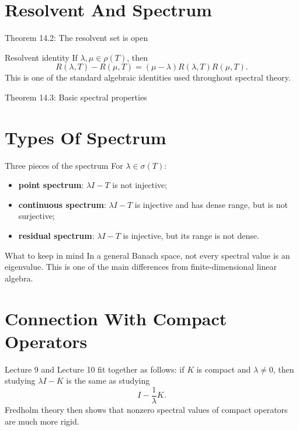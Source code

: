 \documentclass[11pt]{article}
\begin{document}
\section{Resolvent And Spectrum}

\begin{thmbox}{Theorem 14.2: The resolvent set is open}
\thmResolventAnalytic
\end{thmbox}

\begin{thmbox}{Resolvent identity}
If $\lambda,\mu\in\rho(T)$, then
\[
R(\lambda,T)-R(\mu,T)=(\mu-\lambda)R(\lambda,T)R(\mu,T).
\]
This is one of the standard algebraic identities used throughout spectral theory.
\end{thmbox}

\begin{thmbox}{Theorem 14.3: Basic spectral properties}
\thmSpectralRadius
\end{thmbox}

\section{Types Of Spectrum}

\begin{defbox}{Three pieces of the spectrum}
For $\lambda\in\sigma(T)$:
\begin{itemize}
\item \textbf{point spectrum}: $\lambda I-T$ is not injective;
\item \textbf{continuous spectrum}: $\lambda I-T$ is injective and has dense range, but is not surjective;
\item \textbf{residual spectrum}: $\lambda I-T$ is injective, but its range is not dense.
\end{itemize}
\end{defbox}

\begin{exbox}{What to keep in mind}
In a general Banach space, not every spectral value is an eigenvalue. This is one of the main differences from finite-dimensional linear algebra.
\end{exbox}

\section{Connection With Compact Operators}

\begin{focusbox}
Lecture 9 and Lecture 10 fit together as follows: if $K$ is compact and $\lambda\neq 0$, then studying $\lambda I-K$ is the same as studying
\[
I-\frac{1}{\lambda}K.
\]
Fredholm theory then shows that nonzero spectral values of compact operators are much more rigid.
\end{focusbox}
\end{document}
